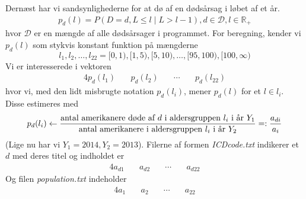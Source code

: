 \documentclass[a4paper, 12pt]{memoir}
\begin{document}
Dernæst har vi sandsynlighederne for at dø af en dødsårsag i løbet af et år.
\begin{gather*}
p_d(l)=P(D=d, L\leq l \mid L> l-1), d\in \mathcal D, l\in \mathbb R_+
\end{gather*}
hvor $\mathcal D$ er en mængde af alle dødsårsager i programmet. For beregning, kender vi $p_d(l)$ som stykvis konstant funktion på mængderne
\begin{equation*}
l_1,l_2, \dots, l_{22}=[0,1), [1,5), [5,10),\dots, [95,100), [100,\infty)
\end{equation*}
Vi er interesserede i vektoren
\begin{alignat*}{4}
p_d(l_1)\quad & p_d(l_2)\quad & \cdots \quad & p_d(l_{22})
\end{alignat*}
hvor vi, med den lidt misbrugte notation $p_d(l_i)$, mener $p_d(l)$ for et $l\in l_i$. Disse estimeres med
\begin{equation*}
p_d(l_i)\leftarrow \frac{\textup{antal amerikanere døde af } d \textup{ i aldersgruppen } l_i \textup{ i år } Y_1}{\textup{antal amerikanere i aldersgruppen } l_i \textup{ i år } Y_2 }=:\frac{a_{di}}{a_i}
\end{equation*}
(Lige nu har vi $Y_1=2014, Y_2=2013$). Filerne af formen \emph{ICDcode.txt} indikerer et $d$ med deres titel og indholdet er
\begin{alignat*}{4}
a_{d1} \quad &a_{d2} \quad &\cdots \quad &a_{d22}  
\end{alignat*}
Og filen \emph{population.txt} indeholder
\begin{alignat*}{4}
a_{1} \quad &a_{2} \quad &\cdots \quad &a_{22}  
\end{alignat*}
\end{document}
